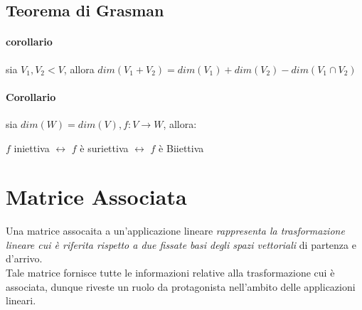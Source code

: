 \subsection{Teorema di Grasman}
\paragraph{corollario} sia $V_1,V_2<V$, allora $dim(V_1+V_2)=dim(V_1) + dim(V_2) - dim(V_1 \cap V_2)$

\paragraph{Corollario} sia $dim(W)=dim(V), f:V\to W$, allora:
\begin{center}
	$f$ iniettiva $\leftrightarrow$ $f$ è suriettiva $\leftrightarrow$ $f$ è Biiettiva
\end{center}

\section{Matrice Associata}
Una matrice assocaita a un'applicazione lineare \emph{rappresenta la trasformazione lineare cui è riferita rispetto a due fissate basi degli spazi vettoriali} di partenza e d'arrivo.
\\Tale matrice fornisce tutte le informazioni relative alla trasformazione cui è associata, dunque riveste un ruolo da protagonista nell'ambito delle applicazioni lineari.


